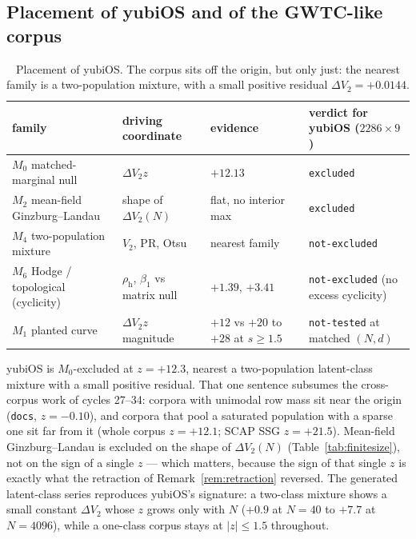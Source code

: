 \documentclass[11pt,a4paper]{article}
\theoremstyle{plain}
\theoremstyle{remark}
\theoremstyle{plain}
\begin{document}
\subsection{Placement of yubiOS and of the GWTC-like corpus}

\begin{table}[h]
\centering
\small
\begin{tabular}{llll}
\toprule
family & driving coordinate & evidence & verdict for yubiOS ($2286\times9$) \\
\midrule
$M_0$ matched-marginal null & $\Delta V_2z$ & $+12.13$ & \texttt{excluded} \\
$M_2$ mean-field Ginzburg--Landau & shape of $\Delta V_2(N)$ & flat, no interior max & \texttt{excluded} \\
$M_4$ two-population mixture & $V_2$, $\mathrm{PR}$, Otsu & nearest family & \texttt{not-excluded} \\
$M_6$ Hodge / topological (cyclicity) & $\rho_{\mathrm h}$, $\beta_1$ vs matrix null & $+1.39$, $+3.41$ & \texttt{not-excluded} (no excess cyclicity) \\
$M_1$ planted curve & $\Delta V_2z$ magnitude & $+12$ vs $+20$ to $+28$ at $s\ge1.5$ & \texttt{not-tested} at matched $(N,d)$ \\
\bottomrule
\end{tabular}
\caption{Placement of yubiOS. The corpus sits off the origin, but only just: the nearest family is a two-population mixture, with a small positive residual $\Delta V_2=+0.0144$.}
\label{tab:placement}
\end{table}

yubiOS is $M_0$-excluded at $z=+12.3$, nearest a two-population latent-class mixture with a small positive residual. That one sentence subsumes the cross-corpus work of cycles 27--34: corpora with unimodal row mass sit near the origin (\texttt{docs}, $z=-0.10$), and corpora that pool a saturated population with a sparse one sit far from it (whole corpus $z=+12.1$; SCAP SSG $z=+21.5$). Mean-field Ginzburg--Landau is excluded on the shape of $\Delta V_2(N)$ (Table~\ref{tab:finitesize}), not on the sign of a single $z$ --- which matters, because the sign of that single $z$ is exactly what the retraction of Remark~\ref{rem:retraction} reversed. The generated latent-class series reproduces yubiOS's signature: a two-class mixture shows a small constant $\Delta V_2$ whose $z$ grows only with $N$ ($+0.9$ at $N=40$ to $+7.7$ at $N=4096$), while a one-class corpus stays at $|z|\le1.5$ throughout.
\end{document}
